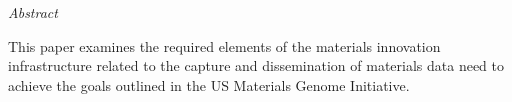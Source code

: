 \textit{Abstract} 

This paper examines the required elements of the materials innovation infrastructure related to the capture and dissemination of materials data need to achieve the goals outlined in the US Materials Genome Initiative.